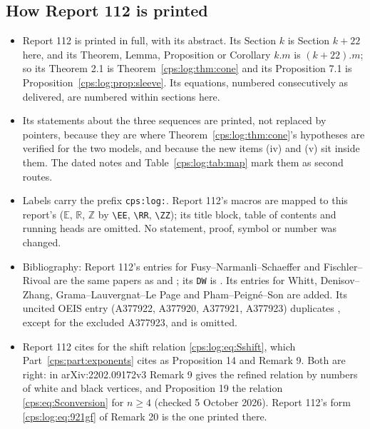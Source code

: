\documentclass[11pt,letterpaper]{article}
\numberwithin{equation}{section}
\theoremstyle{remark}\newtheorem{remark}[theorem]{Remark}
\newcommand{\EE}{\mathbb E}
\newcommand{\ZZ}{\mathbb Z}
\newcommand{\RR}{\mathbb R}
\begin{document}
\subsection{How Report 112 is printed}\label{cps:log:sec:printing}
\begin{itemize}
\item Report 112 is printed in full, with its abstract. Its Section $k$ is Section $k+22$ here,
 and its Theorem, Lemma, Proposition or Corollary $k.m$ is $(k+22).m$; so its Theorem 2.1 is
 Theorem~\ref{cps:log:thm:cone} and its Proposition 7.1 is
 Proposition~\ref{cps:log:prop:sleeve}. Its equations, numbered consecutively as delivered, are
 numbered within sections here.
\item Its statements about the three sequences are printed, not replaced by pointers, because
 they are where Theorem~\ref{cps:log:thm:cone}'s hypotheses are verified for the two models, and
 because the new items (iv) and (v) sit inside them. The dated notes and
 Table~\ref{cps:log:tab:map} mark them as second routes.
\item Labels carry the prefix \texttt{cps:log:}. Report 112's macros are mapped to this report's
 ($\mathbb E$, $\mathbb R$, $\mathbb Z$ by \verb|\EE|, \verb|\RR|, \verb|\ZZ|); its title block,
 table of contents and running heads are omitted. No statement, proof, symbol or number was
 changed.
\item Bibliography: Report 112's entries for Fusy--Narmanli--Schaeffer and Fischler--Rivoal are
 the same papers as \cite{FNS} and \cite{FR}; its \texttt{DW} is \cite{DWrevisited}. Its entries
 for Whitt, Denisov--Zhang, Grama--Lauvergnat--Le Page and Pham--Peign\'e--Son are added. Its
 uncited OEIS entry (A377922, A377920, A377921, A377923) duplicates \cite{OEISP,OEISS}, except
 for the excluded A377923, and is omitted.
\item Report 112 cites \cite[Proposition 19]{FNS} for the shift relation
 \eqref{cps:log:eq:Sshift}, which Part~\ref{cps:part:exponents} cites as Proposition 14 and
 Remark 9. Both are right: in arXiv:2202.09172v3 Remark 9 gives the refined relation by numbers
 of white and black vertices, and Proposition 19 the relation \eqref{cps:eq:Sconversion} for
 $n\ge4$ (checked 5 October 2026). Report 112's form \eqref{cps:log:eq:921gf} of Remark 20 is the
 one printed there.
\end{itemize}
\end{document}
